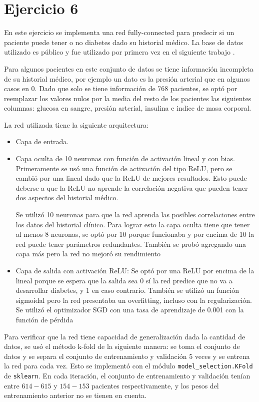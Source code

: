 \section*{Ejercicio 6}

    En este ejercicio se implementa una red fully-connected para predecir si un paciente puede tener o no diabetes dado su historial médico. La base de datos utilizado es público y fue utilizado por primera vez en el siguiente trabajo \cite{pima}.

    Para algunos pacientes en este conjunto de datos se tiene información incompleta de su historial médico, por ejemplo un dato es la presión arterial que en algunos casos en 0. Dado que solo se tiene información de 768 pacientes, se optó por reemplazar los valores nulos por la media del resto de los pacientes las siguientes columnas: glucosa en sangre, presión arterial, insulina e indice de masa corporal.


    La red utilizada tiene la siguiente arquitectura:

    \begin{itemize}
        \item Capa de entrada.
        \item Capa oculta de 10 neuronas con función de activación lineal y con bias.
        Primeramente se usó una función de activación del tipo ReLU, pero se cambió por una lineal dado que la ReLU de mejores resultados. Esto puede  deberse a que la ReLU no aprende la correlación negativa que pueden tener dos aspectos del historial médico.  

        Se utilizó 10 neuronas para que la red aprenda las posibles correlaciones entre los datos del historial clínico. Para lograr esto la capa oculta tiene que tener al menos 8 neuronas, se optó por 10 porque funcionaba y por encima de 10 la red puede tener parámetros redundantes. También se probó agregando una capa más pero la red no mejoró su rendimiento

        \item Capa de salida con activación ReLU: Se optó por una ReLU por encima de la lineal porque se espera que la salida sea 0 sí la red predice que no va a desarrollar diabetes, y 1 en caso contrario. También se utilizó un función sigmoidal pero la red presentaba un overfitting, incluso con la regularización. Se utilizó el optimizador SGD con una tasa de aprendizaje de 0.001 con la función de pérdida  
    \end{itemize}

    Para verificar que la red tiene capacidad de generalización dada la cantidad de datos, se usó el método k-fold de la siguiente manera: se toma el conjunto de datos y se separa el conjunto de entrenamiento y validación $5$ veces y se entrena la red para cada vez. Esto se implementó con el módulo \verb|model_selection.KFold| de  \verb|sklearn|. En cada iteración, el conjunto de entrenamiento y validación tenían entre $614-615$ y $154-153$ pacientes respectivamente, y los pesos del entrenamiento anterior no se tienen en cuenta. 

